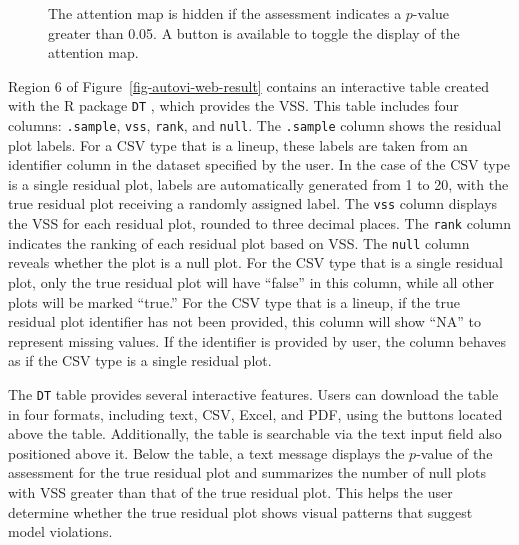 \documentclass[
doublespace,
  times]{anzsauth}
\begin{document}
\begin{figure}


\caption{\label{fig-autovi-web-gradient-hide}The attention map is hidden
if the assessment indicates a \(p\)-value greater than 0.05. A button is
available to toggle the display of the attention map.}

\end{figure}%

Region 6 of Figure~\ref{fig-autovi-web-result} contains an interactive
table created with the R package \texttt{DT} \citep{dt}, which provides
the VSS. This table includes four columns: \texttt{.sample},
\texttt{vss}, \texttt{rank}, and \texttt{null}. The \texttt{.sample}
column shows the residual plot labels. For a CSV type that is a lineup,
these labels are taken from an identifier column in the dataset
specified by the user. In the case of the CSV type is a single residual
plot, labels are automatically generated from 1 to 20, with the true
residual plot receiving a randomly assigned label. The \texttt{vss}
column displays the VSS for each residual plot, rounded to three decimal
places. The \texttt{rank} column indicates the ranking of each residual
plot based on VSS. The \texttt{null} column reveals whether the plot is
a null plot. For the CSV type that is a single residual plot, only the
true residual plot will have ``false'' in this column, while all other
plots will be marked ``true.'' For the CSV type that is a lineup, if the
true residual plot identifier has not been provided, this column will
show ``NA'' to represent missing values. If the identifier is provided
by user, the column behaves as if the CSV type is a single residual
plot.

The \texttt{DT} table provides several interactive features. Users can
download the table in four formats, including text, CSV, Excel, and PDF,
using the buttons located above the table. Additionally, the table is
searchable via the text input field also positioned above it. Below the
table, a text message displays the \(p\)-value of the assessment for the
true residual plot and summarizes the number of null plots with VSS
greater than that of the true residual plot. This helps the user
determine whether the true residual plot shows visual patterns that
suggest model violations.
\end{document}
